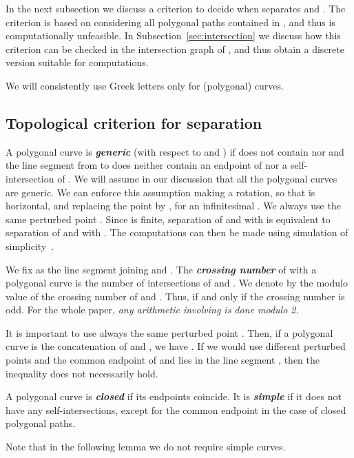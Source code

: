 \documentclass[a4paper,11pt]{article}
\def\DEF#1{\textbf{\emph{#1}}}
\begin{document}
In the next subsection we discuss a criterion to decide when  separates  and .
The criterion is based on considering all polygonal paths contained in , and thus is
computationally unfeasible.
In Subsection~\ref{sec:intersection} we discuss how this criterion can be checked 
in the intersection graph of , and thus obtain a discrete version suitable
for computations.

We will consistently use Greek letters  only for (polygonal) curves.

\subsection{Topological criterion for separation} 

A polygonal curve  is \DEF{generic} (with respect to  and ) if  does not contain
 nor  and the line segment from  to  does neither contain an endpoint
of  nor a self-intersection of . 
We will assume in our discussion that all the polygonal curves are generic.
We can enforce this assumption making a rotation, so that  is horizontal,
and replacing the point  by , for an infinitesimal .
We always use the same perturbed point .
Since  is finite,
separation of  and  with  is equivalent to separation of  and  with .
The computations can then be made using simulation of simplicity~\cite{sos}.

We fix  as the line segment joining  and .
The \DEF{crossing number} of  with a polygonal curve 
is the number of intersections of  and .
We denote by  the modulo  value of the crossing number of  and .
Thus,  if and only if the crossing number is odd.
For the whole paper, \emph{any arithmetic involving  is done modulo 2.}

It is important to use always the same perturbed point . Then, if a polygonal curve  is 
the concatenation of  and , we have
. If we would use different perturbed points
and the common endpoint of  and  lies in the line segment ,
then the inequality does not necessarily hold.

A polygonal curve  is \DEF{closed} if its endpoints coincide.
It is \DEF{simple} if it does not have any self-intersections, except for the common
endpoint in the case of closed polygonal paths. 

Note that in the following lemma we do not require simple curves.
\end{document}
